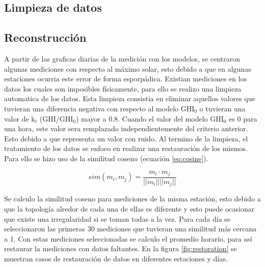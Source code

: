 \subsection{Limpieza de datos}
\subsection{Reconstrucción}

A partir de las graficas diarias de la medición con los modelos, se centraron algunas mediciones con respecto al máximo solar, esto debido a que en algunas estaciones ocurria este error de forma esporpádica. Existian mediciones en los datos los cuales son imposibles físicamente, para ello se realizo una limpieza automatica de los datos. Esta limpieza consistia en eliminar aquellos valores que tuvieran una diferencia negativa con respecto al modelo GHI$_0$ o tuvieran una valor de k$_t$ (GHI/GHI$_0$) mayor a 0.8. Cuando el valor del modelo GHI$_0$ es 0 para una hora, este valor sera remplazado independientemente del criterio anterior. Esto debido a que representa un valor con ruido. Al termino de la limpieza, el tratamiento de los datos se enfoco en realizar una restauración de los mismos. Para ello se hizo uso de la similitud coseno (ecuación \ref{eq:cosine}).


\begin{equation}
	sim(m_i , m_j ) = \frac{m_i \cdot m_j}{||m_i|| ||m_j||}
	\label{eq:cosine}
\end{equation}

Se calculo la similitud coseno para mediciones de la misma estación, esto debido a que la topología alredor de cada una de ellas es diferente y esto puede ocasionar que existe una irregularidad si se toman todas a la vez. Para cada día se seleccionaron las primeras 30 mediciones que tuvieran una similitud más cercana a 1. Con estas mediciones seleccionadas se calculo el promedio horario, para así restaurar la mediciones con datos faltantes. En la figura \ref{fig:restoration} se muestran casos de restauración de datos en diferentes estaciones y días.


